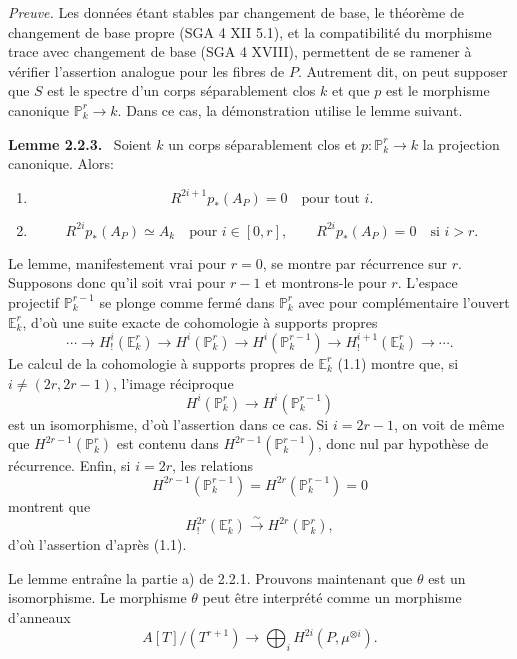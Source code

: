 \documentclass[11pt]{article}
\newenvironment{statement}[1]{\par\medskip\noindent\textbf{#1.}\ }{\par\medskip}
\begin{document}
\emph{Preuve.} Les données étant stables par changement de base, le théorème de changement de base propre (SGA 4 XII 5.1), et la compatibilité du morphisme trace avec changement de base (SGA 4 XVIII), permettent de se ramener à vérifier l'assertion analogue pour les fibres de $P$. Autrement dit, on peut supposer que $S$ est le spectre d'un corps séparablement clos $k$ et que $p$ est le morphisme canonique $\mathbb P^r_k\to k$. Dans ce cas, la démonstration utilise le lemme suivant.

\begin{statement}{Lemme 2.2.3}
Soient $k$ un corps séparablement clos et $p:\mathbb P_k^r\to k$ la projection canonique. Alors:
\begin{enumerate}[label=\alph*)]
\item
\[
R^{2i+1}p_*(A_P)=0\quad\text{pour tout }i.
\]
\item
\[
R^{2i}p_*(A_P)\simeq A_k\quad\text{pour }i\in[0,r],
\qquad
R^{2i}p_*(A_P)=0\quad\text{si }i>r.
\]
\end{enumerate}
\end{statement}

Le lemme, manifestement vrai pour $r=0$, se montre par récurrence sur $r$. Supposons donc qu'il soit vrai pour $r-1$ et montrons-le pour $r$. L'espace projectif $\mathbb P_k^{r-1}$ se plonge comme fermé dans $\mathbb P_k^r$ avec pour complémentaire l'ouvert $\mathbb E_k^r$, d'où une suite exacte de cohomologie à supports propres
\[
\cdots\longrightarrow H_!^i(\mathbb E_k^r)\longrightarrow H^i(\mathbb P_k^r)
\longrightarrow H^i(\mathbb P_k^{r-1})\longrightarrow H_!^{i+1}(\mathbb E_k^r)\longrightarrow\cdots.
\]
Le calcul de la cohomologie à supports propres de $\mathbb E_k^r$ (1.1) montre que, si $i\ne(2r,2r-1)$, l'image réciproque
\[
H^i(\mathbb P_k^r)\longrightarrow H^i(\mathbb P_k^{r-1})
\]
est un isomorphisme, d'où l'assertion dans ce cas. Si $i=2r-1$, on voit de même que $H^{2r-1}(\mathbb P_k^r)$ est contenu dans $H^{2r-1}(\mathbb P_k^{r-1})$, donc nul par hypothèse de récurrence. Enfin, si $i=2r$, les relations
\[
H^{2r-1}(\mathbb P_k^{r-1})=H^{2r}(\mathbb P_k^{r-1})=0
\]
montrent que
\[
H_!^{2r}(\mathbb E_k^r)\xrightarrow{\sim}H^{2r}(\mathbb P_k^r),
\]
d'où l'assertion d'après (1.1).

Le lemme entraîne la partie a) de 2.2.1. Prouvons maintenant que $\theta$ est un isomorphisme. Le morphisme $\theta$ peut être interprété comme un morphisme d'anneaux
\[
A[T]/(T^{r+1})\longrightarrow\bigoplus_i H^{2i}(P,\mu^{\otimes i}).
\]
\end{document}
